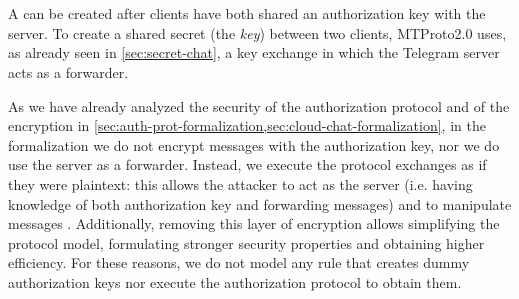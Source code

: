 \section{\Schat{}}
\label{sec:secret-chat-formalization}
A \schat{} can be created after clients have both shared an authorization key with the server. To create a shared secret (the \textit{\schat{} key}) between two clients, MTProto2.0 uses, as already seen in \cref{sec:secret-chat}, a \DiHe{} key exchange in which the Telegram server acts as a forwarder.

As we have already analyzed the security of the authorization protocol and of the \cchat{} encryption in \cref{sec:auth-prot-formalization,sec:cloud-chat-formalization}, in the formalization we do not encrypt messages with the authorization key, nor we do use the server as a forwarder. Instead, we execute the \schat{} protocol exchanges as if they were plaintext: this allows the attacker to act as the server (i.e. having knowledge of both authorization key and forwarding messages) and to manipulate messages \cite{MTProto2-Proverif}. Additionally, removing this layer of encryption allows simplifying the protocol model, formulating stronger security properties and obtaining higher efficiency. For these reasons, we do not model any rule that creates dummy authorization keys nor execute the authorization protocol to obtain them.

